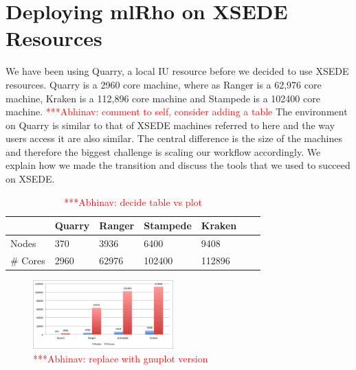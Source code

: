 \documentclass{sig-alternate}
\newcommand{\abhi}[1]{ {\textcolor{red} { ***Abhinav: #1 }}}
\newcommand{\abhi}[1]{ {}}
\begin{document}
%
%
%
%

\section{Deploying mlRho on XSEDE \\Resources}\label{sec:resources}
We have been using Quarry, a local IU resource before we decided to use XSEDE resources. Quarry is a 2960 core machine, where as Ranger is 	a 62,976 core machine, Kraken is a 112,896 core machine and Stampede is a 102400 core machine. \abhi{comment to self, consider adding a table}  The environment on Quarry is similar to that of XSEDE machines referred to here and the way users access it are also similar. The central difference is the size of the machines and therefore the biggest challenge is scaling our workflow accordingly. We explain how we made the transition and discuss the tools that we used to succeed on XSEDE.
\begin{table}
\centering
\begin{tabular}{| l  | l  | l  | l  | l  | l  | l  |} \hline
	&Quarry & Ranger & Stampede & Kraken\\ \hline
Nodes & 370 & 3936 & 6400 & 9408   \\ \hline
\# Cores	& 2960  & 62976&102400 & 112896\\ 
\hline

\end{tabular}
\caption{\abhi{decide table vs plot}  } 
\label{table:cache_comp}
\end{table}


\begin{figure} %
\centering
\includegraphics[width=0.48\textwidth]{figures/cores-nodes.png}
\caption{\abhi{replace with gnuplot version}}
\label{fig:scaling}
\end{figure}
\end{document}
